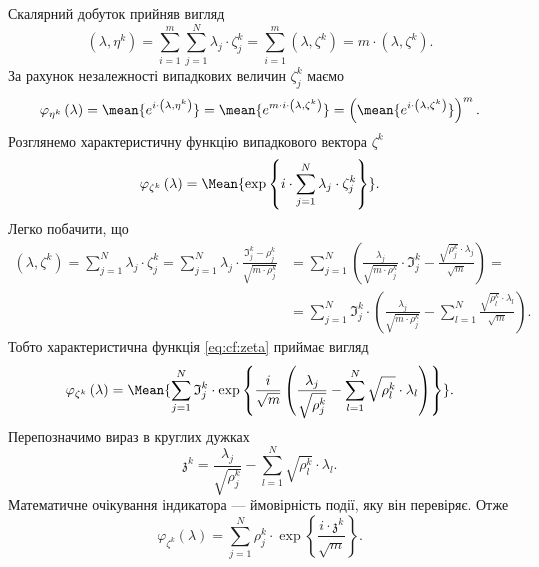 Скалярний добуток прийняв вигляд
\begin{equation*}
    \left( \lambda, \eta^k \right)
    = \sum_{i=1}^{m} \sum_{j=1}^{N} \lambda_j \cdot \zeta_j^k
    = \sum_{i=1}^{m} \left( \lambda, \zeta^k \right)
    = m \cdot \left( \lambda, \zeta^k \right).
\end{equation*}
За рахунок незалежності випадкових величин $\zeta_j^k$ маємо
\begin{equation}\label{eq:cf:eta}
  \varphi_{\eta^k}\left( \lambda\right)
  = \mean{e^{i \cdot \left( \lambda, \eta^k \right)}}
  = \mean{e^{m \cdot i \cdot \left( \lambda, \zeta^k \right)}}
  = \left( \mean{e^{i \cdot \left( \lambda, \zeta^k \right)}} \right)^m.
\end{equation}
Розглянемо характеристичну функцію випадкового вектора $\zeta^k$
\begin{equation}\label{eq:cf:zeta}
  \varphi_{\zeta^k}\left( \lambda \right)
  = \Mean{\exp{\left\{ i
    \cdot \sum_{j=1}^{N} \lambda_j \cdot \zeta_j^k \right\}}}.
\end{equation}
Легко побачити, що
\begin{equation*}
  \begin{split}
    \left( \lambda, \zeta^k \right)
    = \sum_{j=1}^{N} \lambda_j \cdot \zeta_j^k
    = \sum_{j=1}^{N} \lambda_j
      \cdot \frac{\mathfrak{I}_j^k - \rho_j^k}{\sqrt{m \cdot \rho_j^k}}
    &= \sum_{j=1}^{N} \left(
       \frac{\lambda_j}{\sqrt{m \cdot \rho_j^k}} \cdot \mathfrak{I}_j^k
       - \frac{\sqrt{\rho_j^k} \cdot \lambda_j}{\sqrt{m}} \right) = \\
    &= \sum_{j=1}^{N} \mathfrak{I}_j^k \cdot \left( 
        \frac{\lambda_j}{\sqrt{m \cdot \rho_j^k}}
        - \sum_{l=1}^{N} \frac{\sqrt{\rho_l^k} \cdot \lambda_l}{\sqrt{m}}
      \right).
  \end{split}
\end{equation*}
Тобто характеристична функція \eqref{eq:cf:zeta} приймає вигляд
\begin{equation*}
  \varphi_{\zeta^k}\left( \lambda \right)
  = \Mean{\sum_{j=1}^{N} \mathfrak{I}_j^k
    \cdot \exp{\left\{ \frac{i}{\sqrt{m}} \left(
      \frac{\lambda_j}{\sqrt{\rho_j^k}}
      - \sum_{l=1}^{N} \sqrt{\rho_l^k} \cdot \lambda_l \right) \right\}}}.
\end{equation*}
Перепозначимо вираз в круглих дужках
\begin{equation*}
  \mathfrak{z}^k
  = \frac{\lambda_j}{\sqrt{\rho_j^k}}
    - \sum_{l=1}^{N} \sqrt{\rho_l^k} \cdot \lambda_l.
\end{equation*}
Математичне очікування індикатора --- ймовірність події, яку він перевіряє.
Отже
\begin{equation*}
  \varphi_{\zeta^k}\left( \lambda \right)
  = \sum_{j=1}^{N} \rho_j^k
    \cdot \exp{\left\{ \frac{i \cdot \mathfrak{z}^k}{\sqrt{m}} \right\}}.
\end{equation*}

